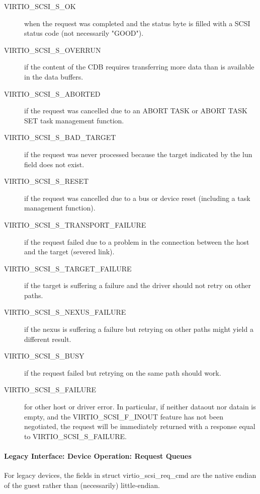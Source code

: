 \begin{description}

\item[VIRTIO_SCSI_S_OK] when the request was completed and the status
  byte is filled with a SCSI status code (not necessarily
  "GOOD").

\item[VIRTIO_SCSI_S_OVERRUN] if the content of the CDB requires
  transferring more data than is available in the data buffers.

\item[VIRTIO_SCSI_S_ABORTED] if the request was cancelled due to an
  ABORT TASK or ABORT TASK SET task management function.

\item[VIRTIO_SCSI_S_BAD_TARGET] if the request was never processed
  because the target indicated by the lun field does not exist.

\item[VIRTIO_SCSI_S_RESET] if the request was cancelled due to a bus
  or device reset (including a task management function).

\item[VIRTIO_SCSI_S_TRANSPORT_FAILURE] if the request failed due to a
  problem in the connection between the host and the target
  (severed link).

\item[VIRTIO_SCSI_S_TARGET_FAILURE] if the target is suffering a
  failure and the driver should not retry on other paths.

\item[VIRTIO_SCSI_S_NEXUS_FAILURE] if the nexus is suffering a failure
  but retrying on other paths might yield a different result.

\item[VIRTIO_SCSI_S_BUSY] if the request failed but retrying on the
  same path should work.

\item[VIRTIO_SCSI_S_FAILURE] for other host or driver error. In
  particular, if neither dataout nor datain is empty, and the
  VIRTIO_SCSI_F_INOUT feature has not been negotiated, the
  request will be immediately returned with a response equal to
  VIRTIO_SCSI_S_FAILURE.
\end{description}

\paragraph{Legacy Interface: Device Operation: Request Queues}\label{sec:Device Types / SCSI Host Device / Device Operation / Device Operation: Request Queues / Legacy Interface: Device Operation: Request Queues}
For legacy devices, the fields in struct virtio_scsi_req_cmd are the
native endian of the guest rather than (necessarily) little-endian.


